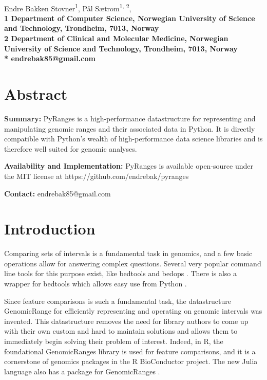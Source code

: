 \documentclass[10pt,letterpaper]{article}
\begin{document}
\vspace*{0.35in}

\begin{flushleft}
{\Large
  \textbf{}
}
\newline
\\
Endre Bakken Stovner\textsuperscript{1},
Pål Sætrom\textsuperscript{1, 2},
\\
\bf{1} Department of
  Computer Science, Norwegian University
  of Science and Technology, Trondheim, 7013, Norway
\\
\bf{2} Department of Clinical and Molecular Medicine, Norwegian
  University of Science and Technology, Trondheim, 7013, Norway
\\
\bigskip
* endrebak85@gmail.com

\end{flushleft}

\section*{Abstract}

\textbf{Summary:} PyRanges is a high-performance datastructure for representing
and manipulating genomic ranges and their associated data in Python. It is
directly compatible with Python's wealth of high-performance data science
libraries and is therefore well suited for genomic analyses.

\textbf{Availability and Implementation:} PyRanges is available open-source under
the MIT license at https://github.com/endrebak/pyranges

\textbf{Contact:} endrebak85@gmail.com

\section*{Introduction}

Comparing sets of intervals is a fundamental task in genomics, and a few basic
operations allow for answering complex questions. Several very popular command
line tools for this purpose exist, like bedtools
\cite{doi:10.1093/bioinformatics/btq033} and bedops
\cite{doi:10.1093/bioinformatics/bts277}. There is also a wrapper for bedtools
which allows easy use from Python \cite{doi:10.1093/bioinformatics/btr539}.

Since feature comparisons is such a fundamental task, the datastructure
GenomicRange for efficiently representing and operating on genomic intervals was
invented. This datastructure removes the need for library authors to come up
with their own custom and hard to maintain solutions and allows them to
immediately begin solving their problem of interest. Indeed, in R, the
foundational GenomicRanges library \cite{10.1371/journal.pcbi.1003118} is used
for feature comparisons, and it is a cornerstone of genomics packages in the R
BioConductor \cite{Gentleman2004} project. The new Julia language
\cite{doi:10.1137/141000671} also has a package for GenomicRanges
\cite{Haverty2017}.
\end{document}
